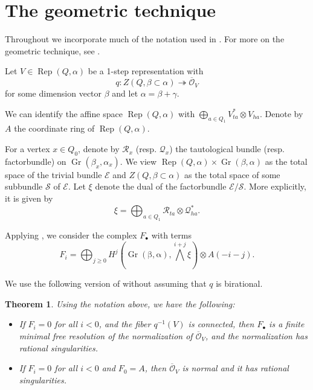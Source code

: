 \documentclass[twoside]{article}
\newcommand{\orb}{\mathcal{O}}
\newcommand{\op}{\operatorname}
\newcommand{\Rep}{\operatorname{Rep}}
\newtheorem{theorem}{Theorem}[section]
\theoremstyle{definition}
\begin{document}
\section{The geometric technique}
\label{sec:geom}

\vspace{0.05in}

Throughout we incorporate much of the notation used in \cite{kavita}. For more on the geometric technique, see \cite{jerzy}. 

Let $V\in \Rep(Q,\alpha)$ be a 1-step representation with
$$q: Z(Q,\beta \subset \alpha) \twoheadrightarrow  \overline{\orb}_V$$
for some dimension vector $\beta$ and let $\alpha=\beta+\gamma$.

We can identify the affine space $\Rep(Q,\alpha)$ with $\bigoplus_{a\in Q_1} V^*_{ta}\otimes V_{ha}$. Denote by $A$ the coordinate ring of $\Rep(Q,\alpha)$.

\vspace{0.05in}

For a vertex $x\in Q_0$, denote by $\mathcal{R}_x$ (resp. $\mathcal{Q}_x$) the tautological bundle (resp. factorbundle) on $\op{Gr}(\beta_x,\alpha_x)$. We view $\Rep(Q,\alpha)\times \op{Gr}(\beta,\alpha)$ as the total space of the trivial bundle $\mathcal{E}$ and $Z(Q,\beta \subset \alpha)$ as the total space of some subbundle $\mathcal{S}$ of $\mathcal{E}$. Let $\xi$ denote the dual of the factorbundle $\mathcal{E}/\mathcal{S}$. More explicitly, it is given by
$$\xi = \bigoplus_{a\in Q_1} \mathcal{R}_{ta}\otimes \mathcal{Q}_{ha}^*.$$

Applying \cite[Theorem 5.1.2]{jerzy}, we consider the complex $F_\bullet$ with terms
\begin{equation}\label{eq:basic}
F_i = \bigoplus_{j\geq 0} H^j (\operatorname{\op{Gr}(\beta,\alpha)}, \bigwedge^{i+j} \xi)\otimes A(-i-j).
\end{equation}

We use the following version of \cite[Theorem 5.1.3]{jerzy} without assuming that $q$ is birational.

\begin{theorem}\label{thm:rational} Using the notation above, we have the following:
\begin{itemize}
\item[(a)] If $F_i=0$ for all $i<0$, and the fiber $q^{-1}(V)$ is connected, then $F_\bullet$ is a finite minimal free resolution of the normalization of $\overline{\orb}_V$, and the normalization has rational singularities.
\item[(b)] If $F_i=0$ for all $i<0$ and $F_0=A$, then $\overline{\orb}_V$ is normal and it has rational singularities.
\end{itemize}
\end{theorem}
\end{document}
